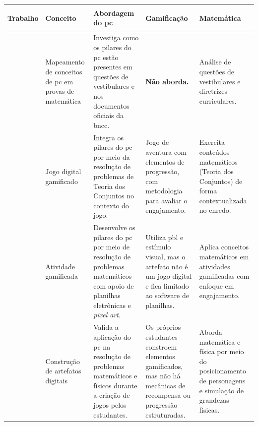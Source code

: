 \begin{quadro}[H]
    \centering
    \caption{Análise comparativa dos trabalhos correlatos}
    \label{qua:correlatos}
    \renewcommand{\arraystretch}{1.2}
    \small
    \begin{tabular}{| >{\bfseries\raggedright\arraybackslash}p{2.3cm} |
        >{\raggedright\arraybackslash}p{2.3cm} |
        >{\raggedright\arraybackslash}p{3.5cm} |
        >{\raggedright\arraybackslash}p{3.0cm} |
        >{\raggedright\arraybackslash}p{3.0cm} |}
        \hline
        \normalfont\bfseries Trabalho & \normalfont\bfseries Conceito &
        \normalfont\bfseries Abordagem do \gls{pc} &
        \normalfont\bfseries Gamificação &
        \normalfont\bfseries Matemática \\
        \hline

        \cite{silva2020} &
        Mapeamento de conceitos de \gls{pc} em provas de matemática &
        Investiga como os pilares do \gls{pc} estão presentes em questões de vestibulares e nos documentos oficiais da \gls{bncc}. &
        \textbf{Não aborda.} &
        Análise de questões de vestibulares e diretrizes curriculares. \\
        \hline

        \cite{lais2024} &
        Jogo digital gamificado &
        Integra os pilares do \gls{pc} por meio da resolução de problemas de Teoria dos Conjuntos no contexto do jogo. &
        Jogo de aventura com elementos de progressão, com metodologia para avaliar o engajamento. &
        Exercita conteúdos matemáticos (Teoria dos Conjuntos) de forma contextualizada no enredo. \\
        \hline

        \cite{teodosio2023atividade} &
        Atividade gamificada &
        Desenvolve os pilares do \gls{pc} por meio de resolução de problemas matemáticos com apoio de planilhas eletrônicas e \textit{pixel art}. &
        Utiliza \gls{pbl} e estímulo visual, mas o artefato não é um jogo digital e fica limitado ao software de planilhas. &
        Aplica conceitos matemáticos em atividades gamificadas com enfoque em engajamento. \\
        \hline

        \cite{filho2025} &
        Construção de artefatos digitais &
        Valida a aplicação do \gls{pc} na resolução de problemas matemáticos e físicos durante a criação de jogos pelos estudantes. &
        Os próprios estudantes constroem elementos gamificados, mas não há mecânicas de recompensa ou progressão estruturadas. &
        Aborda matemática e física por meio do posicionamento de personagens e simulação de grandezas físicas. \\
        \hline


\end{tabular}
\end{quadro}
